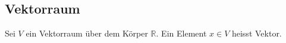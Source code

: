 \subsection{Vektorraum}
Sei $V$ ein Vektorraum \"uber dem K\"orper $\mathbb{R}$.
Ein Element $x \in V$ heisst Vektor.
